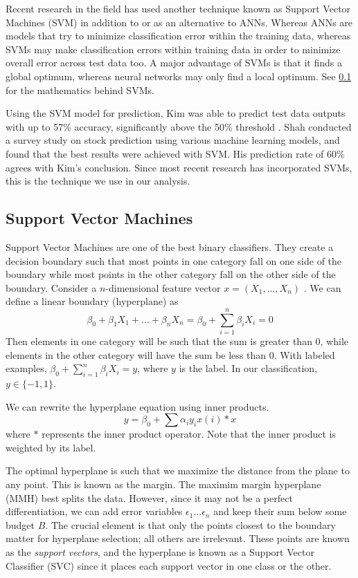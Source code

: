 \documentclass[pageno]{jpaper}
\begin{document}
Recent research in the field has used another technique known as Support Vector Machines (SVM) in addition to or as an alternative to ANNs. Whereas ANNs are models that try to minimize classification error within the training data, whereas SVMs may make classification errors within training data in order to minimize overall error across test data too. A major advantage of SVMs is that it finds a global optimum, whereas neural networks may only find a local optimum. See \ref{subsec: svm} for the mathematics behind SVMs.

Using the SVM model for prediction, Kim was able to predict test data outputs with up to 57\% accuracy, significantly above the 50\% threshold \cite{kim}. Shah conducted a survey study on stock prediction using various machine learning models, and found that the best results were achieved with SVM\cite{shah}. His prediction rate of 60\% agrees with Kim's conclusion. Since most recent research has incorporated SVMs, this is the technique we use in our analysis.

\subsection{Support Vector Machines}
\label{subsec: svm}

Support Vector Machines are one of the best binary classifiers. They create a decision boundary such that most points in one category fall on one side of the boundary while most points in the other category fall on the other side of the boundary. Consider a $n$-dimensional feature vector $x = (X_1, ..., X_n)$ \cite{halls-moore}. We can define a linear boundary (hyperplane) as 
$$\beta_0+\beta_1X_1+...+\beta_nX_n=\beta_0+\sum_{i=1}^n\beta_iX_i = 0$$
Then elements in one category will be such that the sum is greater than 0, while elements in the other category will have the sum be less than 0. With labeled examples, $\beta_0+\sum_{i=1}^n\beta_iX_i = y$, where $y$ is the label. In our classification, $y \in \{-1, 1\}$.

We can rewrite the hyperplane equation using inner products.
$$y = \beta_0 + \sum \alpha_iy_ix(i)*x$$
where $*$ represents the inner product operator. Note that the inner product is weighted by its label. 

The optimal hyperplane is such that we maximize the distance from the plane to any point. This is known as the margin. The maximim margin hyperplane (MMH) best splits the data. However, since it may not be a perfect differentiation, we can add error variables $\epsilon_1 ... \epsilon_n$ and keep their sum below some budget $B$. The crucial element is that only the points closest to the boundary matter for hyperplane selection; all others are irrelevant. These points are known as the {\em support vectors}, and the hyperplane is known as a Support Vector Classifier (SVC) since it places each support vector in one class or the other.
\end{document}

